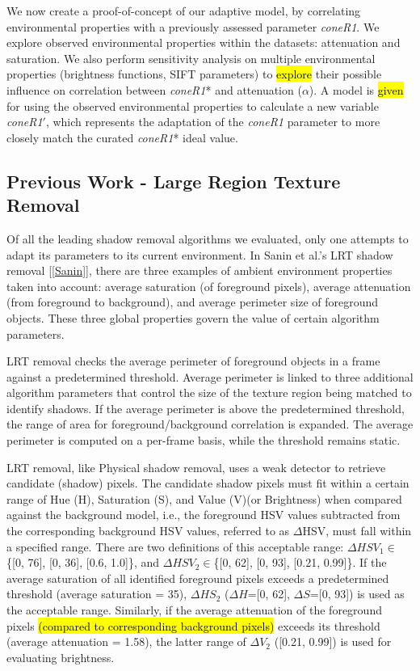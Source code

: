 We now create a proof-of-concept of our adaptive model, by correlating environmental properties with a previously assessed parameter \textit{coneR1}. We explore observed environmental properties within the datasets: attenuation and saturation. We also perform sensitivity analysis on multiple environmental properties (brightness functions, SIFT parameters) to \hl{explore} their possible influence on correlation between \textit{coneR1}* and attenuation ($\alpha$). A model is \hl{given} for using the observed environmental properties to calculate a new variable \textit{coneR1}$'$, which represents the adaptation of the \textit{coneR1} parameter to more closely match the curated \textit{coneR1}* ideal value.

\subsection{Previous Work - Large Region Texture Removal} \label{section:prevworkLRT}

Of all the leading shadow removal algorithms we evaluated, only one attempts to adapt its parameters to its current environment. In Sanin et al.'s LRT shadow removal [\ref{Sanin}], there are three examples of ambient environment properties taken into account: average saturation (of foreground pixels), average attenuation (from foreground to background), and average perimeter size of foreground objects. These three global properties govern the value of certain algorithm parameters.

LRT removal checks the average perimeter of foreground objects in a frame against a predetermined threshold. Average perimeter is linked to three additional algorithm parameters that control the size of the texture region being matched to identify shadows. If the average perimeter is above the predetermined threshold, the range of area for foreground/background correlation is expanded. The average perimeter is computed on a per-frame basis, while the threshold remains static.

LRT removal, like Physical shadow removal, uses a weak detector to retrieve candidate (shadow) pixels. The candidate shadow pixels must fit within a certain range of Hue (H), Saturation (S), and Value (V)(or Brightness) when compared against the background model, i.e., the foreground HSV values subtracted from the corresponding background HSV values, referred to as $\Delta$HSV, must fall within a specified range. There are two definitions of this acceptable range: $\Delta HSV_{1}\in$\{[0, 76], [0, 36], [0.6, 1.0]\}, and $\Delta HSV_{2}\in$\{[0, 62], [0, 93], [0.21, 0.99]\}. If the average saturation of all identified foreground pixels exceeds a predetermined threshold (average saturation = 35), $\Delta HS_{2}$ ($\Delta H$=[0, 62], $\Delta S$=[0, 93]) is used as the acceptable range. Similarly, if the average attenuation of the foreground pixels \hl{(compared to corresponding background pixels)} exceeds its threshold (average attenuation = 1.58), the latter range of $\Delta V_{2}$ ([0.21, 0.99]) is used for evaluating brightness. 

